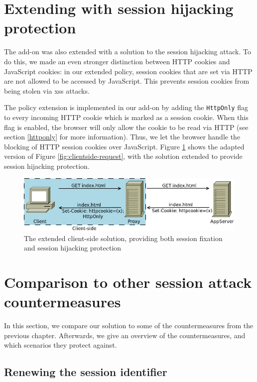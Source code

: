 \section{Extending with session hijacking protection}

The add-on was also extended with a solution to the session hijacking attack. To do this, we made an even stronger distinction between HTTP cookies and JavaScript cookies: in our extended policy, session cookies that are set via HTTP are not allowed to be accessed by JavaScript. This prevents session cookies from being stolen via \gls{xss} attacks.

The policy extension is implemented in our add-on by adding the \texttt{HttpOnly} flag to every incoming HTTP cookie which is marked as a session cookie. When this flag is enabled, the browser will only allow the cookie to be read via HTTP (see section \ref{httponly} for more information). Thus, we let the browser handle the blocking of HTTP session cookies over JavaScript. Figure \ref{fig:clientside-httponly} shows the adapted version of Figure \ref{fig:clientside-request}, with the solution extended to provide session hijacking protection.

\begin{figure}[htb]
	\centering
	\includegraphics[width=.7\textwidth]{img/clientside-proxy-3.png}
	\caption[The extended client-side solution]{The extended client-side solution, providing both session fixation and session hijacking protection}
	\label{fig:clientside-httponly}
\end{figure}
 
\section{Comparison to other session attack countermeasures}\label{related-work}%

In this section, we compare our solution to some of the countermeasures from the previous chapter. Afterwards, we give an overview of the countermeasures, and which scenarios they protect against. %

\subsection{Renewing the session identifier}

